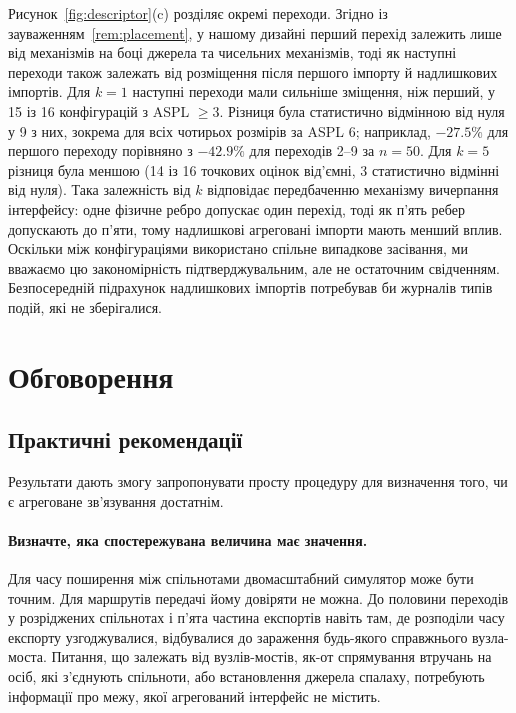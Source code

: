 Рисунок~\ref{fig:descriptor}(c) розділяє окремі переходи. Згідно із зауваженням~\ref{rem:placement}, у нашому дизайні перший перехід залежить лише від механізмів на боці джерела та чисельних механізмів, тоді як наступні переходи також залежать від розміщення після першого імпорту й надлишкових імпортів. Для $k=1$ наступні переходи мали сильніше зміщення, ніж перший, у 15 із 16 конфігурацій з ASPL $\ge3$. Різниця була статистично відмінною від нуля у 9 з них, зокрема для всіх чотирьох розмірів за ASPL 6; наприклад, $-27.5\%$ для першого переходу порівняно з $-42.9\%$ для переходів 2--9 за $n=50$. Для $k=5$ різниця була меншою (14 із 16 точкових оцінок від'ємні, 3 статистично відмінні від нуля). Така залежність від $k$ відповідає передбаченню механізму вичерпання інтерфейсу: одне фізичне ребро допускає один перехід, тоді як п'ять ребер допускають до п'яти, тому надлишкові агреговані імпорти мають менший вплив. Оскільки між конфігураціями використано спільне випадкове засівання, ми вважаємо цю закономірність підтверджувальним, але не остаточним свідченням. Безпосередній підрахунок надлишкових імпортів потребував би журналів типів подій, які не зберігалися.

\clearpage
\section{Обговорення}
\label{sec:discussion}

\subsection{Практичні рекомендації}

Результати дають змогу запропонувати просту процедуру для визначення того, чи є агреговане зв'язування достатнім.

\paragraph{Визначте, яка спостережувана величина має значення.}
Для часу поширення між спільнотами двомасштабний симулятор може бути точним. Для маршрутів передачі йому довіряти не можна. До половини переходів у розріджених спільнотах і п'ята частина експортів навіть там, де розподіли часу експорту узгоджувалися, відбувалися до зараження будь-якого справжнього вузла-моста. Питання, що залежать від вузлів-мостів, як-от спрямування втручань на осіб, які з'єднують спільноти, або встановлення джерела спалаху, потребують інформації про межу, якої агрегований інтерфейс не містить.

